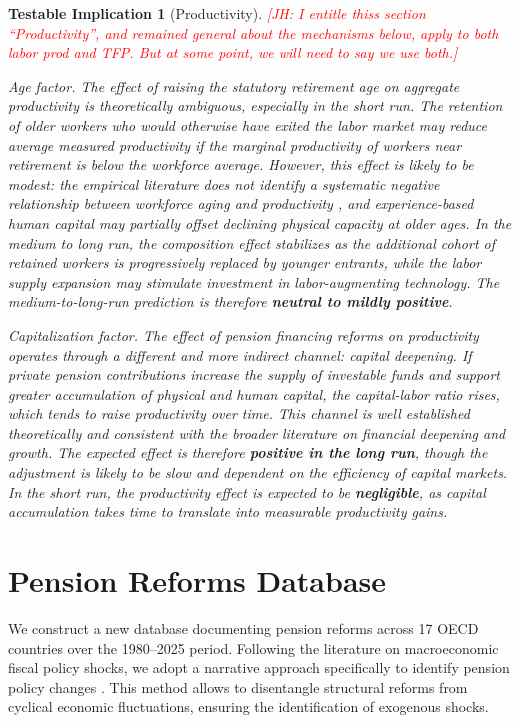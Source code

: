 \documentclass[11pt,english,a4paper, twoside, authoryear]{article}
\newtheorem{testable}{Testable Implication}}
\begin{document}
\begin{testable}[Productivity]\label{test:prod}
\textcolor{red}{[JH: I entitle thiss section ``Productivity'', and remained general about the mechanisms below, apply to both labor prod and TFP. But at some point, we will need to say we use both.]}

\textit{Age factor.} The effect of raising the statutory retirement age on aggregate productivity is theoretically ambiguous, especially in the short run. The retention of older workers who would otherwise have exited the labor market may reduce average measured productivity if the marginal productivity of workers near retirement is below the workforce average. However, this effect is likely to be modest: the empirical literature does not identify a systematic negative relationship between workforce aging and productivity \citep{Dai2022}, and experience-based human capital may partially offset declining physical capacity at older ages. In the medium to long run, the composition effect stabilizes as the additional cohort of retained workers is progressively replaced by younger entrants, while the labor supply expansion may stimulate investment in labor-augmenting technology. The medium-to-long-run prediction is therefore \textbf{neutral to mildly positive}.

\textit{Capitalization factor.} The effect of pension financing reforms on productivity operates through a different and more indirect channel: capital deepening. If private pension contributions increase the supply of investable funds and support greater accumulation of physical and human capital, the capital-labor ratio rises, which tends to raise productivity over time. This channel is well established theoretically and consistent with the broader literature on financial deepening and growth. The expected effect is therefore \textbf{positive in the long run}, though the adjustment is likely to be slow and dependent on the efficiency of capital markets. In the short run, the productivity effect is expected to be \textbf{negligible}, as capital accumulation takes time to translate into measurable productivity gains.
\end{testable}



\section{Pension Reforms Database}\label{sec:data}

We construct a new database documenting pension reforms across 17 OECD countries over the 1980--2025 period. Following the literature on macroeconomic fiscal policy shocks, we adopt a narrative approach \citep{Ramey2009, RomerRomer2010} specifically to identify pension policy changes \citep{Beetsma2020, BiZubairy2023, romp_political_2024}. This method allows to disentangle structural reforms from cyclical economic fluctuations, ensuring the identification of exogenous shocks.
\end{document}
